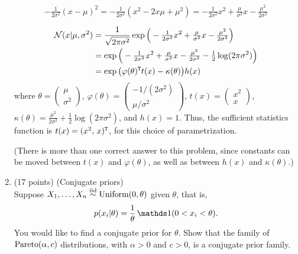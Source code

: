 \documentclass[12pt]{article}
\newcommand{\ds}{\displaystyle}
\begin{document}
\begin{enumerate}
    $$-\tfrac{1}{2\sigma^2}(x-\mu)^2
      = -\tfrac{1}{2\sigma^2}(x^2-2 x\mu+\mu^2) 
      = -\tfrac{1}{2\sigma^2}x^2 + \tfrac{\mu}{\sigma^2} x -\tfrac{\mu^2}{2\sigma^2}$$

    \begin{align*}
        \mathcal{N}(x|\mu,\sigma^2) 
        &= \frac{1}{\sqrt{2\pi\sigma^2}}\exp\Big(-\tfrac{1}{2\sigma^2}x^2 + \tfrac{\mu}{\sigma^2} x -\tfrac{\mu^2}{2\sigma^2}\Big) \\
        &= \exp\Big(-\tfrac{1}{2\sigma^2}x^2 + \tfrac{\mu}{\sigma^2} x -\tfrac{\mu^2}{2\sigma^2} - \tfrac{1}{2}\log(2\pi\sigma^2)\Big) \\
        &= \exp\big(\varphi(\theta)^{\mathtt{T}} t(x)-\kappa(\theta)\big) h(x)
    \end{align*}
    where
    $\ds\theta = \begin{pmatrix}\mu\\\sigma^2\end{pmatrix}$,
    $\ds\varphi(\theta) = \begin{pmatrix}-1/(2\sigma^2) \\ \mu/\sigma^2\end{pmatrix}$,
    $\ds t(x) = \begin{pmatrix}x^2 \\ x\end{pmatrix}$,
        $\kappa(\theta) = \tfrac{\mu^2}{2\sigma^2} + \tfrac{1}{2}\log(2\pi\sigma^2)$, and $h(x) = 1$.
        Thus, the sufficient statistics function is $t(x) = (x^2 ,\, x)^{\mathtt{T}}$, for this choice of parametrization.

        (There is more than one correct answer to this problem, since constants can be moved between $t(x)$ and $\varphi(\theta)$, as well as
        between $h(x)$ and $\kappa(\theta)$.)

\newpage
\item (17 points) (Conjugate priors)\\
    Suppose $X_1,\ldots,X_n\stackrel{\mathrm{iid}}{\sim}\operatorname*{Uniform}(0,\theta)$ given $\theta$, that is,
    $$ p(x_i|\theta) = \frac{1}{\theta}\,\I(0<x_i<\theta). $$
    You would like to find a conjugate prior for $\theta$.
    Show that the family of $\operatorname*{Pareto}(\alpha,c)$ distributions, with $\alpha>0$ and $c>0$, is a conjugate prior family.


\end{enumerate}
\end{document}
